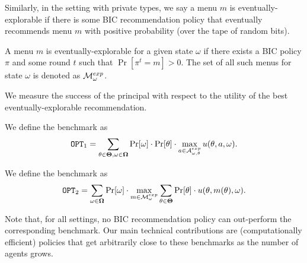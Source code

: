 Similarly, in the setting with private types, we say a menu $m$ is eventually-explorable if there is some BIC recommendation policy that eventually recommends menu $m$ with positive probability (over the tape of random bits).

\begin{definition}
	A menu $m$ is eventually-explorable for a given state $\omega$ if there exists a BIC policy $\pi$ and some round $t$ such that $\Pr[\pi^t= m]> 0$. The set of all such menus for state $\omega$ is denoted as $\mathcal{M}_{\omega}^{exp}$.
\end{definition}

We measure the success of the principal with respect to the utility of the best eventually-explorable recommendation.

\begin{definition}
	We define the benchmark as
	\[
	\mathtt{OPT}_1 = \sum_{\theta \in \bold{\Theta}, \omega\in \bold{\Omega}} \Pr[\omega] \cdot \Pr[\theta] \cdot \max_{a \in \mathcal{A}_{\omega,\theta}^{exp}} u(\theta, a, \omega).
	\]
\end{definition}

\begin{definition}
	We define the benchmark as
	\[
	\mathtt{OPT}_2 = \sum_{\omega\in \bold{\Omega}} \Pr[\omega] \cdot\max_{m \in \mathcal{M}_{\omega}^{exp}}\sum_{\theta \in \bold{\Theta}} \Pr[\theta] \cdot  u(\theta, m(\theta), \omega).
	\]
\end{definition}

Note that, for all settings, no BIC recommendation policy can out-perform the corresponding benchmark.  Our main technical contributions are (computationally efficient) policies that get arbitrarily close to these benchmarks as the number of agents grows.
